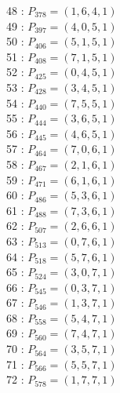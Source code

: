 \documentclass{article}
\begin{document}
{\begin{multicols}{3}
48 : $P_{378}=( 1, 6, 4, 1 )$\\
49 : $P_{397}=( 4, 0, 5, 1 )$\\
50 : $P_{406}=( 5, 1, 5, 1 )$\\
51 : $P_{408}=( 7, 1, 5, 1 )$\\
52 : $P_{425}=( 0, 4, 5, 1 )$\\
53 : $P_{428}=( 3, 4, 5, 1 )$\\
54 : $P_{440}=( 7, 5, 5, 1 )$\\
55 : $P_{444}=( 3, 6, 5, 1 )$\\
56 : $P_{445}=( 4, 6, 5, 1 )$\\
57 : $P_{464}=( 7, 0, 6, 1 )$\\
58 : $P_{467}=( 2, 1, 6, 1 )$\\
59 : $P_{471}=( 6, 1, 6, 1 )$\\
60 : $P_{486}=( 5, 3, 6, 1 )$\\
61 : $P_{488}=( 7, 3, 6, 1 )$\\
62 : $P_{507}=( 2, 6, 6, 1 )$\\
63 : $P_{513}=( 0, 7, 6, 1 )$\\
64 : $P_{518}=( 5, 7, 6, 1 )$\\
65 : $P_{524}=( 3, 0, 7, 1 )$\\
66 : $P_{545}=( 0, 3, 7, 1 )$\\
67 : $P_{546}=( 1, 3, 7, 1 )$\\
68 : $P_{558}=( 5, 4, 7, 1 )$\\
69 : $P_{560}=( 7, 4, 7, 1 )$\\
70 : $P_{564}=( 3, 5, 7, 1 )$\\
71 : $P_{566}=( 5, 5, 7, 1 )$\\
72 : $P_{578}=( 1, 7, 7, 1 )$\\
\end{multicols}


%


%


}%
\end{document}
